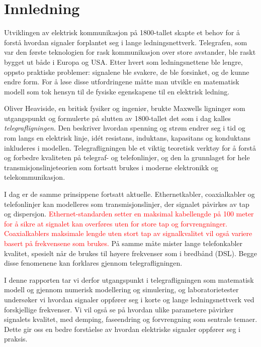 \section{Innledning}

Utviklingen av elektrisk kommunikasjon på 1800-tallet skapte et behov for å forstå hvordan 
signaler forplantet seg i lange ledningsnettverk. Telegrafen, som var den første teknologien 
for rask kommunikasjon over store avstander, ble raskt bygget ut både i Europa og USA. Etter hvert 
som ledningsnettene ble lengre, oppsto praktiske problemer: signalene ble svakere, de ble 
forsinket, og de kunne endre form. For å løse disse utfordringene måtte man utvikle en matematisk 
modell som tok hensyn til de fysiske egenskapene til en elektrisk ledning.

Oliver Heaviside, en britisk fysiker og ingeniør, brukte Maxwells ligninger som utgangspunkt og 
formulerte på slutten av 1800-tallet det som i dag kalles \textit{telegrafligningen}. Den beskriver 
hvordan spenning og strøm endrer seg i tid og rom langs en elektrisk linje, idét 
resistans, induktans, kapasitans og konduktans inkluderes i modellen. Telegrafligningen ble et viktig teoretisk verktøy 
for å forstå og forbedre kvaliteten på telegraf- og telefonlinjer, og den la grunnlaget for hele 
transmisjonslinjeteorien som fortsatt brukes i moderne elektronikk og telekommunikasjon.

I dag er de samme prinsippene fortsatt aktuelle. Ethernetkabler, coaxialkabler og telefonlinjer kan modelleres 
som transmisjonslinjer, der signalet påvirkes av tap og dispersjon. \textcolor{red}{Ethernet-standarden setter en 
maksimal kabellengde på 100 meter for å sikre at signalet kan overføres uten for store tap og 
forvrengninger. Coaxialkablers maksimale lengde uten stort tap av signalkvalitet vil også variere basert på frekvensene som brukes.} På samme måte mister lange telefonkabler kvalitet, spesielt når de brukes til høyere 
frekvenser som i bredbånd (DSL). Begge disse fenomenene kan forklares gjennom telegrafligningen.

I denne rapporten tar vi derfor utgangspunkt i telegrafligningen som matematisk modell og gjennom numerisk
modellering og simulering, og laboratorietester undersøker vi hvordan signaler oppfører seg i korte og 
lange ledningsnettverk ved forskjellige frekvenser. Vi vil også se på hvordan ulike parametere påvirker 
signalets kvalitet, med demping, faseendring og forvrengning som sentrale temaer. Dette gir oss en bedre forståelse av
hvordan elektriske signaler oppfører seg i praksis. 